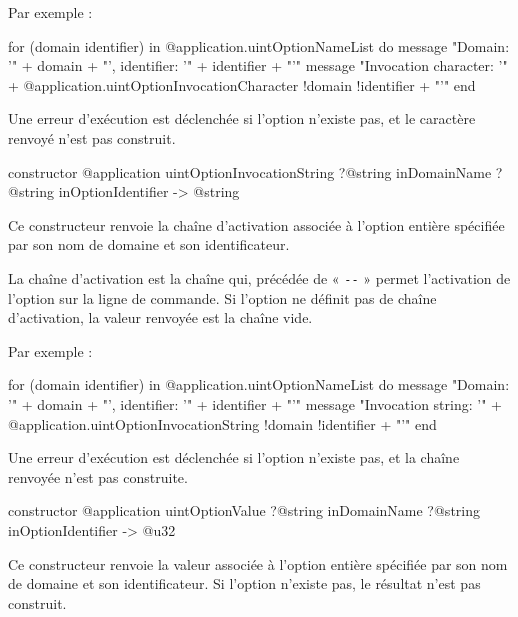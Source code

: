  Par exemple :
\begin{galgas4}
for (domain identifier) in @application.uintOptionNameList do
  message "Domain: '" + domain + "', identifier: '" + identifier + "'\n"
  message "Invocation character: '"
    + @application.uintOptionInvocationCharacter {!domain !identifier} + "'\n"
end
\end{galgas4}

Une erreur d'exécution est déclenchée si l'option n'existe pas, et le caractère renvoyé n'est pas construit.



\begin{galgas4box}
constructor @application uintOptionInvocationString
    ?@string inDomainName
    ?@string inOptionIdentifier -> @string
\end{galgas4box}

Ce constructeur renvoie la chaîne d'activation associée à l'option entière spécifiée par son nom de domaine et son identificateur.

La chaîne d'activation est la chaîne qui, précédée de « \texttt{-{}-} » permet l'activation de l'option sur la ligne de commande. Si l'option ne définit pas de chaîne d'activation, la valeur renvoyée est la chaîne vide.

 Par exemple :
\begin{galgas4}
for (domain identifier) in @application.uintOptionNameList do
  message "Domain: '" + domain + "', identifier: '" + identifier + "'\n"
  message "Invocation string: '"
    + @application.uintOptionInvocationString {!domain !identifier} + "'\n"
end
\end{galgas4}

Une erreur d'exécution est déclenchée si l'option n'existe pas, et la chaîne renvoyée n'est pas construite.



\begin{galgas4box}
constructor @application uintOptionValue
    ?@string inDomainName
    ?@string inOptionIdentifier -> @u32
\end{galgas4box}

Ce constructeur renvoie la valeur associée à l'option entière spécifiée par son nom de domaine et son identificateur. Si l'option n'existe pas, le résultat n'est pas construit.






